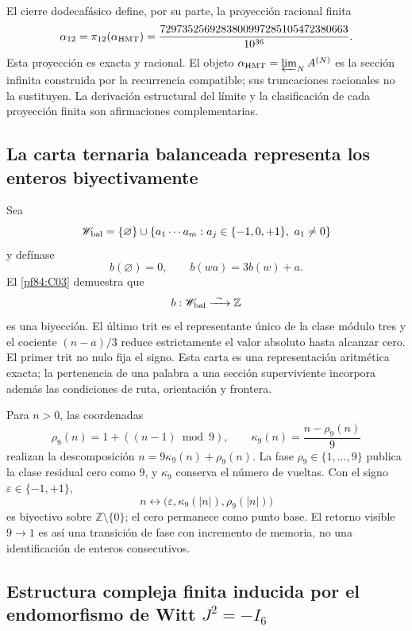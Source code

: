 El cierre dodecaf\'asico define, por su parte, la proyecci\'on racional finita
\begin{equation}
 \alpha_{12}=\pi_{12}(\alpha_{\rm HMT})
 =\frac{7297352569283800997285105472380663}{10^{36}}.
 \label{p3-83-c44-s1:eq:alpha-racional-taxonomia-rev11}
\end{equation}
Esta proyecci\'on es exacta y racional. El objeto
\(\alpha_{\rm HMT}=\varprojlim_NA^{(N)}\) es la secci\'on infinita construida
por la recurrencia compatible; sus truncaciones racionales no la sustituyen.
La derivaci\'on estructural del l\'imite y la clasificaci\'on de cada
proyecci\'on finita son afirmaciones complementarias.

\subsection{La carta ternaria balanceada representa los enteros
biyectivamente}

Sea
\[
 \mathscr W_{\rm bal}
 =\{\varnothing\}\cup
 \{a_1\cdots a_m:
 a_j\in\{-1,0,+1\},\ a_1\neq0\}
\]
y def\'inase
\[
 b(\varnothing)=0,
 \qquad
 b(wa)=3b(w)+a.
\]
El \cref{pf84:C03} demuestra que
\begin{equation}
 b:\mathscr W_{\rm bal}\xrightarrow{\ \sim\ }\mathbb Z
 \label{p3-83-c44-s1:eq:carta-entera-balanceada-rev11}
\end{equation}
es una biyecci\'on. El último trit es el representante único de la
clase m\'odulo tres y el cociente \((n-a)/3\) reduce estrictamente el valor
absoluto hasta alcanzar cero. El primer trit no nulo fija el signo. Esta carta
es una representaci\'on aritm\'etica exacta; la pertenencia de una palabra a una
secci\'on superviviente incorpora adem\'as las condiciones de ruta,
orientaci\'on y frontera.

Para \(n>0\), las coordenadas
\[
 \rho_9(n)=1+((n-1)\bmod9),
 \qquad
 \kappa_9(n)=\frac{n-\rho_9(n)}9
\]
realizan la descomposici\'on \(n=9\kappa_9(n)+\rho_9(n)\). La fase
\(\rho_9\in\{1,\ldots,9\}\) publica la clase residual cero como \(9\), y
\(\kappa_9\) conserva el n\'umero de vueltas. Con el signo
\(\varepsilon\in\{-1,+1\}\),
\[
 n\longleftrightarrow
 \bigl(\varepsilon,\kappa_9(|n|),\rho_9(|n|)\bigr)
\]
es biyectivo sobre \(\mathbb Z\setminus\{0\}\); el cero permanece como punto
base. El retorno visible \(9\to1\) es as\'i una transici\'on de fase con
incremento de memoria, no una identificaci\'on de enteros consecutivos.

\subsection{Estructura compleja finita inducida por el endomorfismo de Witt \texorpdfstring{\(J^2=-I_6\)}{J²=-I₆}}

